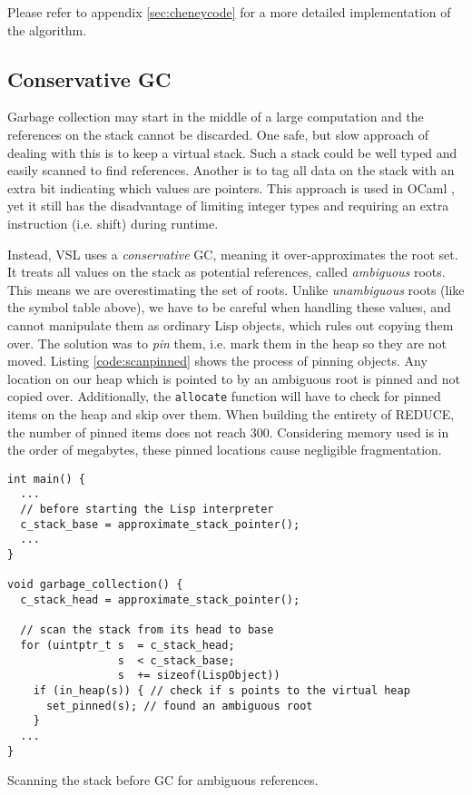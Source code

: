 Please refer to appendix \ref{sec:cheneycode} for a more detailed implementation of the algorithm.

\subsection{Conservative GC}

Garbage collection may start in the middle of a large computation and the references on the stack cannot be discarded.
One safe, but slow approach of dealing with this is to keep a virtual stack. Such a stack could be well typed and easily scanned to find
references. Another is to tag all data on the stack with an extra bit indicating which values are pointers. This approach
is used in OCaml \cite[Chapter~20]{rwoc}, yet it still has the disadvantage of limiting integer types and requiring an extra
instruction (i.e. shift) during runtime.

Instead, VSL uses a \emph{conservative} GC, meaning it over-approximates the root set.
It treats all values on the stack as potential references, called \emph{ambiguous} roots.
This means we are overestimating the set of roots. Unlike \emph{unambiguous} roots (like the symbol table above), we
have to be careful when handling these values, and cannot manipulate them as ordinary Lisp objects, which rules out
copying them over. The solution was
to \emph{pin} them, i.e. mark them in the heap so they are not moved. Listing \ref{code:scanpinned}
shows the process of pinning objects.
Any location on our heap which is pointed to by an ambiguous root is pinned and not copied over.
Additionally, the \texttt{allocate} function will have to check for pinned items on the heap and skip over them.
When building the entirety of REDUCE, the number of pinned items does not reach 300.
Considering memory used is in the order of megabytes, these pinned locations cause negligible fragmentation.

\begin{code}
\begin{verbatim}
int main() {
  ...
  // before starting the Lisp interpreter
  c_stack_base = approximate_stack_pointer();
  ...
}

void garbage_collection() {
  c_stack_head = approximate_stack_pointer();

  // scan the stack from its head to base
  for (uintptr_t s  = c_stack_head;
                 s  < c_stack_base;
                 s  += sizeof(LispObject))
    if (in_heap(s)) { // check if s points to the virtual heap
      set_pinned(s); // found an ambiguous root
    }
  ...
}
\end{verbatim}
\caption{Scanning the stack before GC for ambiguous references.}
\label{code:scanpinned}
\end{code}

